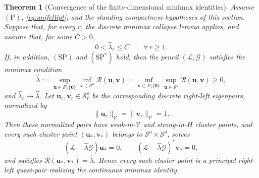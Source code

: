 \documentclass[preprint,10pt]{elsarticle}
\theoremstyle{plain}
\newtheorem{theorem}{Theorem}
\theoremstyle{definition}
\theoremstyle{remark}
\begin{document}
\begin{theorem}[Convergence of the finite-dimensional minimax identities]
	\label{thm:continuous-minimax-limit}
	Assume \(\mathrm{(P)}\), \eqref{eq:unifellipt}, and the standing compactness
	hypotheses of this section. Suppose that, for every \(r\), the discrete
	minimax collapse lemma applies, and assume that, for some \(C>0\),
	\begin{equation}\label{eq:estM}
		0<\hat\lambda_r\le C
		\qquad
		\forall\,r\ge1.
	\end{equation}
	If, in addition, \(\mathrm{(SP)}\) and \(\mathrm{(SP^*)}\) hold, then the pencil
	\((\mathcal L,\mathcal G)\) satisfies the minimax condition
	\begin{equation}\label{eq:mimaPrin1}
		\hat\lambda
		:=
		\sup_{\mathbf u\in\mathcal S\setminus\{\mathbf0\}}
		\inf_{\mathbf v\in\mathcal S^o}\mathcal R(\mathbf u,\mathbf v)
		=
		\inf_{\mathbf v\in\mathcal S\setminus\{\mathbf0\}}
		\sup_{\mathbf u\in\mathcal S^o}\mathcal R(\mathbf u,\mathbf v)
		\ge
		0,
	\end{equation}
	and \(\hat\lambda_r\to\hat\lambda\). Let
	\(\mathbf u_r,\mathbf v_r\in\mathcal S_r^o\) be the corresponding discrete
	right-left eigenpairs, normalized by
	\[
	\|\mathbf u_r\|_{\mathcal V}
	=
	\|\mathbf v_r\|_{\mathcal V}
	=
	1.
	\]
	Then these normalized pairs have weak-in-\(\mathcal V\) and strong-in-\(H\)
	cluster points, and every such cluster point \((\mathbf u_*,\mathbf v_*)\)
	belongs to \(\mathcal S^o\times\mathcal S^o\), solves
	\[
	(\mathcal L-\hat\lambda\mathcal G)\mathbf u_*=0,
	\qquad
	(\mathcal L-\hat\lambda\mathcal G)^*\mathbf v_*=0,
	\]
	and satisfies \(\mathcal R(\mathbf u_*,\mathbf v_*)=\hat\lambda\). Hence
	every such cluster point is a principal right-left quasi-pair realizing
	the continuous minimax identity.
\end{theorem}
\end{document}
